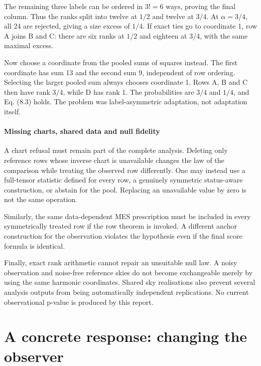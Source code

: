 \documentclass[
  11pt,
  a4paper]{article}
\begin{document}
The remaining three labels can be ordered in \(3!=6\) ways, proving the final column. Thus the ranks split into twelve at \(1/2\) and twelve at \(3/4\). At \(\alpha=3/4\), all 24 are rejected, giving a size excess of \(1/4\). If exact ties go to coordinate 1, row A joins B and C: there are six ranks at \(1/2\) and eighteen at \(3/4\), with the same maximal excess.

Now choose a coordinate from the pooled sums of squares instead. The first coordinate has sum 13 and the second sum 9, independent of row ordering. Selecting the larger pooled sum always chooses coordinate 1. Rows A, B and C then have rank \(3/4\), while D has rank 1. The probabilities are \(3/4\) and \(1/4\), and Eq. (8.3) holds. The problem was label-asymmetric adaptation, not adaptation itself.

\hypertarget{missing-charts-shared-data-and-null-fidelity}{%
\subsection{Missing charts, shared data and null fidelity}\label{missing-charts-shared-data-and-null-fidelity}}

A chart refusal must remain part of the complete analysis. Deleting only reference rows whose inverse chart is unavailable changes the law of the comparison while treating the observed row differently. One may instead use a full-tensor statistic defined for every row, a genuinely symmetric status-aware construction, or abstain for the pool. Replacing an unavailable value by zero is not the same operation.

Similarly, the same data-dependent MES prescription must be included in every symmetrically treated row if the row theorem is invoked. A different anchor construction for the observation violates the hypothesis even if the final score formula is identical.

Finally, exact rank arithmetic cannot repair an unsuitable null law. A noisy observation and noise-free reference skies do not become exchangeable merely by using the same harmonic coordinates. Shared sky realisations also prevent several analysis outputs from being automatically independent replications. No current observational p-value is produced by this report.

\clearpage
\part{A concrete response: changing the observer}
\end{document}

